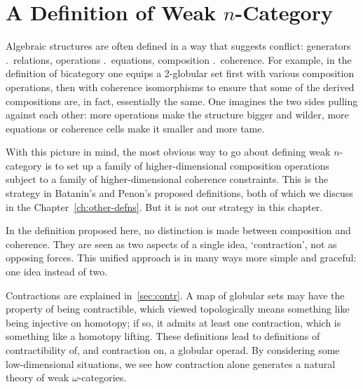 
\chapter{A Definition of Weak $n$-Category}



\noindent
Algebraic structures are often defined in a way that suggests conflict:
generators \vs.\ relations, operations \vs.\ equations, composition%
%
%
%
%
%
\vs.\
coherence.  For example, in the definition of bicategory one equips a
2-globular set first with various composition operations, then with
coherence isomorphisms to ensure that some of the derived compositions are,
in fact, essentially the same.  One imagines the two sides pulling against
each other: more operations make the structure bigger and wilder, more
equations or coherence cells make it smaller and more tame.

With this picture in mind, the most obvious way to go about defining weak
$n$-category is to set up a family of higher-dimensional composition
operations subject to a family of higher-dimensional coherence constraints.
This is the strategy in Batanin's and Penon's proposed definitions, both of
which we discuss in the Chapter~\ref{ch:other-defns}.  But it is not our
strategy in this chapter.

In the definition proposed here, no distinction is made between composition
and coherence.  They are seen as two aspects of a single idea,
`contraction', not as opposing forces.  This unified approach is in many
ways more simple and graceful: one idea instead of two.

Contractions%
%
%
are explained in~\ref{sec:contr}.  A map of globular sets may have the
property of being contractible, which viewed topologically means something
like being injective on homotopy; if so, it admits at least one
contraction, which is something like a homotopy%
%
%
lifting.  These definitions
lead to definitions of contractibility of, and contraction on, a globular
operad.  By considering some low-dimensional situations, we see how
contraction alone generates a natural theory of weak $\omega$-categories. 

